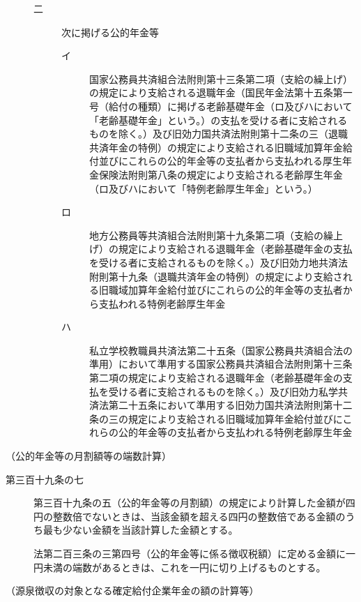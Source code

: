 \documentclass[twocolumn,a4j,10pt]{ltjtarticle}
\begin{document}
\begin{description}
\begin{description}
\begin{description}
\end{description}
\item[二]次に掲げる公的年金等
\begin{description}
\item[イ]国家公務員共済組合法附則第十三条第二項（支給の繰上げ）の規定により支給される退職年金（国民年金法第十五条第一号（給付の種類）に掲げる老齢基礎年金（ロ及びハにおいて「老齢基礎年金」という。）の支払を受ける者に支給されるものを除く。）及び旧効力国共済法附則第十二条の三（退職共済年金の特例）の規定により支給される旧職域加算年金給付並びにこれらの公的年金等の支払者から支払われる厚生年金保険法附則第八条の規定により支給される老齢厚生年金（ロ及びハにおいて「特例老齢厚生年金」という。）
\item[ロ]地方公務員等共済組合法附則第十九条第二項（支給の繰上げ）の規定により支給される退職年金（老齢基礎年金の支払を受ける者に支給されるものを除く。）及び旧効力地共済法附則第十九条（退職共済年金の特例）の規定により支給される旧職域加算年金給付並びにこれらの公的年金等の支払者から支払われる特例老齢厚生年金
\item[ハ]私立学校教職員共済法第二十五条（国家公務員共済組合法の準用）において準用する国家公務員共済組合法附則第十三条第二項の規定により支給される退職年金（老齢基礎年金の支払を受ける者に支給されるものを除く。）及び旧効力私学共済法第二十五条において準用する旧効力国共済法附則第十二条の三の規定により支給される旧職域加算年金給付並びにこれらの公的年金等の支払者から支払われる特例老齢厚生年金
\end{description}
\end{description}
\end{description}
\noindent\hspace{10pt}（公的年金等の月割額等の端数計算）
\begin{description}
\item[第三百十九条の七]第三百十九条の五（公的年金等の月割額）の規定により計算した金額が四円の整数倍でないときは、当該金額を超える四円の整数倍である金額のうち最も少ない金額を当該計算した金額とする。
\item[]法第二百三条の三第四号（公的年金等に係る徴収税額）に定める金額に一円未満の端数があるときは、これを一円に切り上げるものとする。
\end{description}
\noindent\hspace{10pt}（源泉徴収の対象となる確定給付企業年金の額の計算等）
\end{document}
